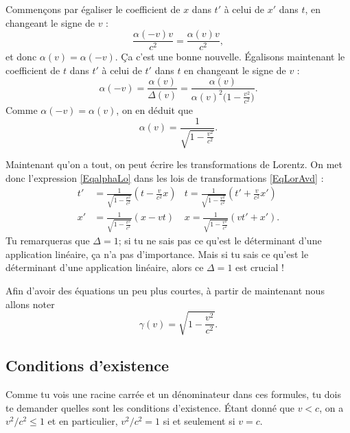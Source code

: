\begin{enumerate}
	      Commençons par égaliser le coefficient de \( x\) dans \( t'\) à celui de \( x'\) dans \( t\), en changeant le signe de \( v\) :
	      \[
		      \frac{ \alpha(-v)v }{ c^2 }=\frac{ \alpha(v)v }{ c^2 },
	      \]
	      et donc \( \alpha(v)=\alpha(-v)\). Ça c'est une bonne nouvelle. Égalisons maintenant le coefficient de \( t\) dans \( t'\) à celui de \( t'\) dans \( t\) en changeant le signe de \( v\) :
	      \[
		      \alpha(-v)=\frac{ \alpha(v) }{ \Delta(v) }=\frac{ \alpha(v) }{ \alpha(v)^2\big( 1-\frac{ v^2 }{ c^2 } \big) }.
	      \]
	      Comme \( \alpha(-v)=\alpha(v)\), on en déduit que
	      \begin{equation}		\label{EqalphaLo}
		      \alpha(v)=\frac{1}{ \sqrt{1-\frac{ v^2 }{ c^2 }} }.
	      \end{equation}
\end{enumerate}

Maintenant qu'on a tout, on peut écrire les transformations de Lorentz. On met donc l'expression \eqref{EqalphaLo} dans les lois de transformations \eqref{EqLorAvd} :
\begin{equation}
	\begin{aligned}		\label{EqTrLorentz}
		t' & = \frac{1}{ \sqrt{1-\frac{ v^2 }{ c^2 }} }\left( t-\frac{ v }{ c^2 }x \right) & t=	\frac{1}{ \sqrt{1-\frac{ v^2 }{ c^2 }} }\left(t'+\frac{ v }{ c^2 }x'\right) \\
		x' & =\frac{1}{ \sqrt{1-\frac{ v^2 }{ c^2 }} }(x-vt)                               & x=\frac{1}{ \sqrt{1-\frac{ v^2 }{ c^2 }} }(vt'+x').
	\end{aligned}
\end{equation}
Tu remarqueras que \( \Delta=1\); si tu ne sais pas ce qu'est le déterminant d'une application linéaire, ça n'a pas d'importance. Mais si tu sais ce qu'est le déterminant d'une application linéaire, alors ce \( \Delta=1\) est crucial !

Afin d'avoir des équations un peu plus courtes, à partir de maintenant nous allons noter
\[
	\gamma(v)=\sqrt{1-\frac{ v^2 }{ c^2 }}.
\]


\subsection{Conditions d'existence}

Comme tu vois une racine carrée et un dénominateur dans ces formules, tu dois te demander quelles sont les conditions d'existence. Étant donné que \( v<c\), on a \( v^2/c^2\leq 1\) et en particulier, \( v^2/c^2=1\) si et seulement si \( v=c\).

